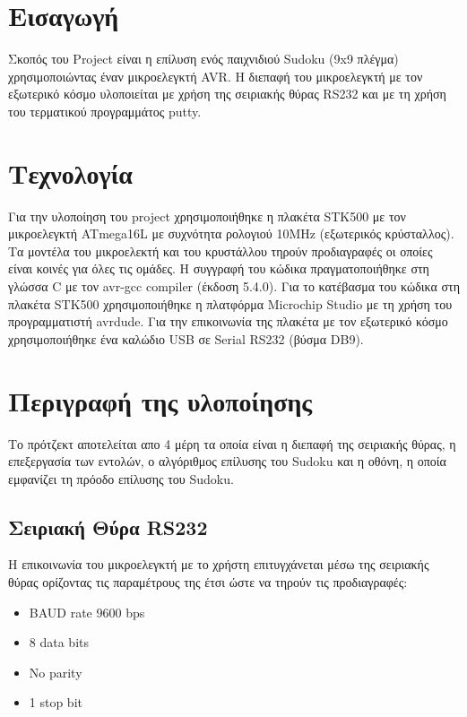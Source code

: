 \documentclass[a4paper,12pt]{article}
\begin{document}


\newpage
\tableofcontents
\newpage

\section{Εισαγωγή}
Σκοπός του Project είναι η επίλυση ενός παιχνιδιού Sudoku (9x9 πλέγμα) χρησιμοποιώντας έναν μικροελεγκτή AVR. Η διεπαφή του μικροελεγκτή με τον εξωτερικό κόσμο υλοποιείται με χρήση της σειριακής θύρας RS232 και με τη χρήση του τερματικού προγραμμάτος putty.

\section{Τεχνολογία}
Για την υλοποίηση του project χρησιμοποιήθηκε η πλακέτα STK500 με τον μικροελεγκτή ATmega16L με συχνότητα ρολογιού 10MHz (εξωτερικός κρύσταλλος). Τα μοντέλα του μικροελεκτή και του κρυστάλλου τηρούν προδιαγραφές οι οποίες είναι κοινές για όλες τις ομάδες. Η συγγραφή του κώδικα πραγματοποιήθηκε στη γλώσσα C με τον avr-gcc compiler (έκδοση 5.4.0). Για το κατέβασμα του κώδικα στη πλακέτα STK500 χρησιμοποιήθηκε η πλατφόρμα Microchip Studio με τη χρήση του προγραμματιστή avrdude. Για την επικοινωνία της πλακέτα με τον εξωτερικό κόσμο χρησιμοποιήθηκε ένα καλώδιο USB σε Serial RS232 (βύσμα DB9).


\section{Περιγραφή της υλοποίησης}
Το πρότζεκτ αποτελείται απο 4 μέρη τα οποία είναι η διεπαφή της σειριακής θύρας, η επεξεργασία των εντολών, ο αλγόριθμος επίλυσης του Sudoku και η οθόνη, η οποία εμφανίζει τη πρόοδο επίλυσης του Sudoku. 

\subsection{Σειριακή Θύρα RS232}
Η επικοινωνία του μικροελεγκτή με το χρήστη επιτυγχάνεται μέσω της σειριακής θύρας ορίζοντας τις παραμέτρους της έτσι ώστε να τηρούν τις προδιαγραφές:\\
\begin{itemize}
	\item BAUD rate 9600 bps
	\item 8 data bits
	\item No parity
	\item 1 stop bit
\end{itemize}
\end{document}
